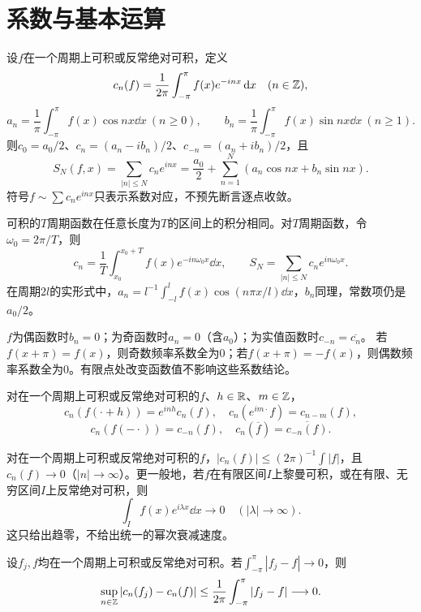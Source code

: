 \section{系数与基本运算}
\begin{result}[定义及实复形式换算]\label{st:coeff}
设$f$在一个周期上可积或反常绝对可积，定义
\[
 c_n(f)=\frac1{2\pi}\int_{-\pi}^{\pi}f(x)e^{-inx}\,\mathrm d x\quad(n\in\mathbb Z),
\]
\[
 a_n=\frac1\pi\int_{-\pi}^{\pi}f(x)\cos nx\dd x\ (n\ge0),\qquad
 b_n=\frac1\pi\int_{-\pi}^{\pi}f(x)\sin nx\dd x\ (n\ge1).
\]
则$c_0=a_0/2$、$c_n=(a_n-ib_n)/2$、$c_{-n}=(a_n+ib_n)/2$，且
\[
 S_N(f,x)=\sum_{|n|\le N}c_ne^{inx}
 =\frac{a_0}2+\sum_{n=1}^N(a_n\cos nx+b_n\sin nx).
\]
符号$f\sim\sum c_ne^{inx}$只表示系数对应，不预先断言逐点收敛。
\end{result}
\begin{result}[周期积分与一般周期]\label{st:period}
可积的$T$周期函数在任意长度为$T$的区间上的积分相同。对$T$周期函数，令$\omega_0=2\pi/T$，则
\[
 c_n=\frac1T\int_{x_0}^{x_0+T}f(x)e^{-in\omega_0x}\dd x,
 \qquad S_N=\sum_{|n|\le N}c_ne^{in\omega_0x}.
\]
在周期$2l$的实形式中，$a_n=l^{-1}\int_{-l}^lf(x)\cos(n\pi x/l)\dd x$，$b_n$同理，常数项仍是$a_0/2$。
\end{result}
\begin{result}[对称性]\label{st:symmetry}
$f$为偶函数时$b_n=0$；为奇函数时$a_n=0$（含$a_0$）；为实值函数时$c_{-n}=\overline{c_n}$。
若$f(x+\pi)=f(x)$，则奇数频率系数全为$0$；若$f(x+\pi)=-f(x)$，则偶数频率系数全为$0$。有限点处改变函数值不影响这些系数结论。
\end{result}
\begin{result}[平移、调制、反射与共轭]\label{st:operations}
对在一个周期上可积或反常绝对可积的$f$、$h\in\mathbb R$、$m\in\mathbb Z$，
\[
 c_n(f(\cdot+h))=e^{inh}c_n(f),\quad
 c_n(e^{im\cdot}f)=c_{n-m}(f),
\]
\[
 c_n(f(-\cdot))=c_{-n}(f),\quad
 c_n(\overline f)=\overline{c_{-n}(f)}.
\]
\end{result}
\begin{result}\label{st:RL}
对在一个周期上可积或反常绝对可积的$f$，$|c_n(f)|\le(2\pi)^{-1}\int|f|$，且$c_n(f)\to0$（$|n|\to\infty$）。更一般地，若$f$在有限区间$I$上黎曼可积，或在有限、无穷区间$I$上反常绝对可积，则
\[
 \int_I f(x)e^{i\lambda x}\dd x\longrightarrow0\quad(|\lambda|\to\infty).
\]
这只给出趋零，不给出统一的幂次衰减速度。
\end{result}
\begin{result}[系数对积分误差的稳定性]\label{st:stability}
设$f_j,f$均在一个周期上可积或反常绝对可积。若$\int_{-\pi}^{\pi}|f_j-f|\to0$，则
\[
 \sup_{n\in\mathbb Z}|c_n(f_j)-c_n(f)|
 \le\frac1{2\pi}\int_{-\pi}^{\pi}|f_j-f|\longrightarrow0.
\]
\end{result}
